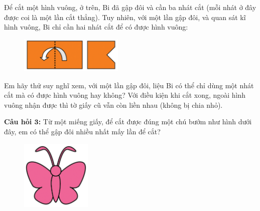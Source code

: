 \begin{multicols}{2}
	Để cắt một hình vuông, ở trên, Bi đã gập đôi và cần ba nhát cắt (mỗi nhát ở đây được coi là một lần cắt thẳng). Tuy nhiên, với một lần gập đôi, và quan sát kĩ hình vuông, Bi chỉ cần hai nhát cắt để có được hình vuông: 
	
	\columnbreak
	\begin{figure}[H]
		\captionsetup{labelformat=empty}
		\vspace*{20pt}
		\centering
		\captionsetup{justification=raggedleft}
		\includegraphics[width =0.44\textwidth]{cat-5}
		\vspace*{-5pt}
	\end{figure}
\end{multicols}
Em hãy thử suy nghĩ xem, với một lần gập đôi, liệu Bi có thể chỉ dùng một nhát cắt mà có  được hình vuông hay không? Với điều kiện khi cắt xong, ngoài hình vuông nhận được thì tờ giấy cũ vẫn còn liền nhau (không bị chia nhỏ).
\vskip 0.1cm
\begin{multicols}{2}
	\textbf{Câu hỏi $\pmb{3}$:} Từ một miếng giấy, để cắt được đúng một chú bướm như hình dưới đây, em có thể gập đôi nhiều nhất mấy lần để cắt?
	
	\columnbreak
	\begin{figure}[H]
		\captionsetup{labelformat=empty}
		\vspace*{-5pt}
		\centering
		\captionsetup{justification=raggedleft}
		\includegraphics[width =0.3\textwidth]{cat-6}
	\end{figure}
\end{multicols}

